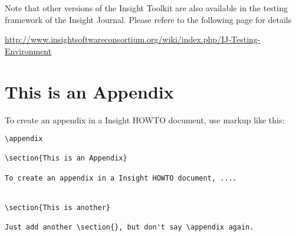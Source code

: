 \documentclass{InsightArticle}
\begin{document}
Note that other versions of the Insight Toolkit are also available in the
testing framework of the Insight Journal. Please refere to the following page
for details

\url{http://www.insightsoftwareconsortium.org/wiki/index.php/IJ-Testing-Environment}





\appendix

\section{This is an Appendix}

To create an appendix in a Insight HOWTO document, use markup like
this:

\begin{verbatim}
\appendix

\section{This is an Appendix}

To create an appendix in a Insight HOWTO document, ....


\section{This is another}

Just add another \section{}, but don't say \appendix again.
\end{verbatim}


%
%

\begin{figure}
\center
\label{fig:RegistrationComponents}
\end{figure}



%
%



\end{document}
